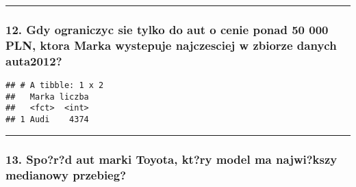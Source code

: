 \documentclass[]{article}
\newenvironment{Shaded}{\begin{snugshade}}{\end{snugshade}}
\newcommand{\KeywordTok}[1]{\textcolor[rgb]{0.13,0.29,0.53}{\textbf{#1}}}
\newcommand{\DataTypeTok}[1]{\textcolor[rgb]{0.13,0.29,0.53}{#1}}
\newcommand{\DecValTok}[1]{\textcolor[rgb]{0.00,0.00,0.81}{#1}}
\newcommand{\StringTok}[1]{\textcolor[rgb]{0.31,0.60,0.02}{#1}}
\newcommand{\OtherTok}[1]{\textcolor[rgb]{0.56,0.35,0.01}{#1}}
\newcommand{\OperatorTok}[1]{\textcolor[rgb]{0.81,0.36,0.00}{\textbf{#1}}}
\newcommand{\NormalTok}[1]{#1}
\begin{document}
\begin{center}\rule{0.5\linewidth}{\linethickness}\end{center}

\subsubsection{12. Gdy ograniczyc sie tylko do aut o cenie ponad 50 000
PLN, ktora Marka wystepuje najczesciej w zbiorze danych
auta2012?}\label{gdy-ograniczyc-sie-tylko-do-aut-o-cenie-ponad-50-000-pln-ktora-marka-wystepuje-najczesciej-w-zbiorze-danych-auta2012}

\begin{Shaded}
\end{Shaded}

\begin{verbatim}
## # A tibble: 1 x 2
##   Marka liczba
##   <fct>  <int>
## 1 Audi    4374
\end{verbatim}

\begin{center}\rule{0.5\linewidth}{\linethickness}\end{center}

\subsubsection{13. Spo?r?d aut marki Toyota, kt?ry model ma najwi?kszy
medianowy
przebieg?}\label{spord-aut-marki-toyota-ktry-model-ma-najwikszy-medianowy-przebieg}

\begin{Shaded}
\end{Shaded}
\end{document}
